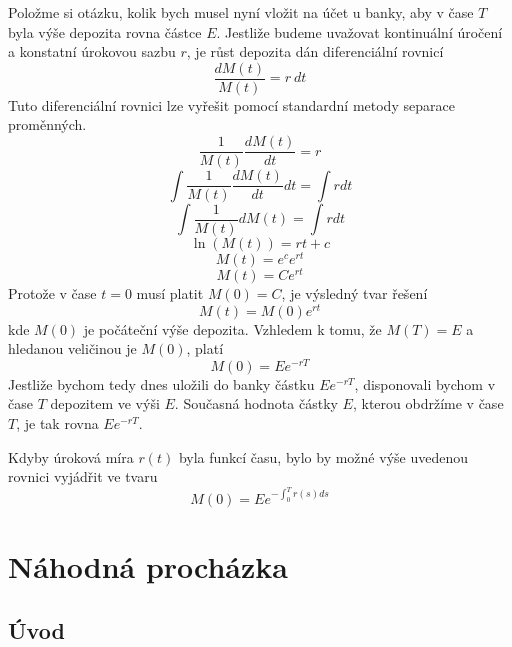 \documentclass[a4paper]{book}
\begin{document}
Položme si otázku, kolik bych musel nyní vložit na účet u banky, aby v čase $T$ byla výše depozita rovna částce $E$. Jestliže budeme uvažovat kontinuální úročení a konstatní úrokovou sazbu $r$, je růst depozita dán diferenciální rovnicí
\begin{equation*}
\frac{dM(t)}{M(t)}=r~dt
\end{equation*}
Tuto diferenciální rovnici lze vyřešit pomocí standardní metody separace proměnných.
\begin{equation*}
\frac{1}{M(t)}\frac{dM(t)}{dt} = r
\end{equation*}
\begin{equation*}
\int \frac{1}{M(t)}\frac{dM(t)}{dt} dt = \int r dt
\end{equation*}
\begin{equation*}
\int \frac{1}{M(t)}dM(t) = \int r dt
\end{equation*}
\begin{equation*}
\ln(M(t)) = rt + c
\end{equation*}
\begin{equation*}
M(t) = e^c e^{rt}
\end{equation*}
\begin{equation*}
M(t) = C e^{rt}
\end{equation*}
Protože v čase $t = 0$ musí platit $M(0) = C$, je výsledný tvar řešení
\begin{equation*}
M(t)=M(0)e^{rt}
\end{equation*}
kde $M(0)$ je počáteční výše depozita. Vzhledem k tomu, že $M(T) = E$ a hledanou veličinou je $M(0)$, platí
\begin{equation*}
M(0)=Ee^{-rT}
\end{equation*}
Jestliže bychom tedy dnes uložili do banky částku $Ee^{-rT}$, disponovali bychom v čase $T$ depozitem ve výši $E$. Současná hodnota částky $E$, kterou obdržíme v čase $T$, je tak rovna  $Ee^{-rT}$.

Kdyby úroková míra $r(t)$ byla funkcí času, bylo by možné výše uvedenou rovnici vyjádřit ve tvaru
\begin{equation*}
M(0)=Ee^{-\int_0^Tr(s)ds}
\end{equation*}

\chapter{Náhodná procházka}

\section{Úvod}
\end{document}
